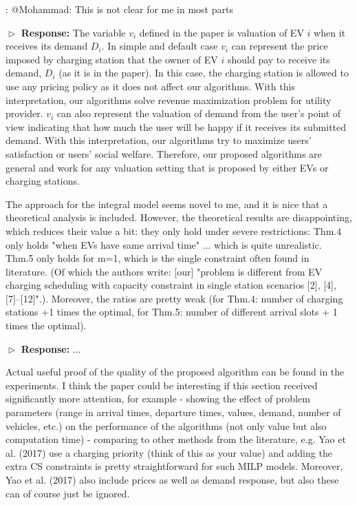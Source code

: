 \documentclass[11pt]{article}
\begin{document}
{\color{red}: @Mohammad: This is not clear for me in most parts} 

$\vartriangleright$ \noindent\textbf{Response:} 
The variable $v_i$ defined in the paper is valuation of EV $i$ when it receives its demand $D_i$. In simple and default case $v_i$ can represent the price imposed by charging station that the owner of EV $i$ should pay to receive its demand, $D_i$ (as it is in the paper). In this case, the charging station is allowed to use any pricing policy as it does not affect our algorithms. With this interpretation, our algorithms solve revenue maximization problem for utility provider. $v_i$ can also represent the valuation of demand from the user's point of view indicating that how much the user will be happy if it receives its submitted demand. With this interpretation, our algorithms try to maximize users' satisfaction or users' social welfare. Therefore, our proposed algorithms are general and work for any valuation setting that is proposed by either EVs or charging stations.
	
\vspace{3mm}
{\color{blue} The approach for the integral model seems novel to me, and it is nice that a theoretical analysis is included. However, the theoretical results are disappointing, which reduces their value a bit: they only hold under severe restrictions: Thm.4 only holds "when EVs have same arrival time" ... which is quite unrealistic. Thm.5 only holds for m=1, which is the single constraint often found in literature. (Of which the authors write: [our] "problem is different from EV charging scheduling with capacity constraint in single station scenarios [2], [4], [7]–[12]".). Moreover, the ratios are pretty weak (for Thm.4: number of charging stations +1 times the optimal, for Thm.5: number of different arrival slots + 1 times the optimal). }
\vspace{3mm}

$\vartriangleright$ \noindent\textbf{Response:} 
...

\vspace{3mm}
{\color{blue} Actual useful proof of the quality of the proposed algorithm can be found in the experiments. I think the paper could be interesting if this section received significantly more attention, for example
 - showing the effect of problem parameters (range in arrival times, departure times, values, demand, number of vehicles, etc.) on the performance of the  algorithms (not only value but also computation time)
 - comparing to other methods from the literature, e.g. Yao et al. (2017) use a charging priority (think of this as your value) and adding the extra CS constraints is pretty straightforward for such MILP models. Moreover, Yao et al. (2017) also include prices as well as demand response, but also these can of course just be ignored.
 }
\vspace{3mm}
\end{document}
